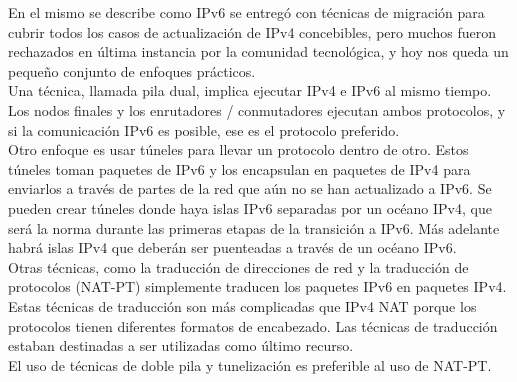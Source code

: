 \documentclass[osajnl,twocolumn,showpacs,superscriptaddress,10pt]{revtex4-1} %
\begin{document}
\begin{enumerate}[a)]
    En el mismo se describe como IPv6 se entregó con técnicas de migración para cubrir todos los casos de actualización de IPv4 
    concebibles, pero muchos fueron rechazados en última instancia por la comunidad tecnológica, y hoy nos queda un pequeño 
    conjunto de enfoques prácticos. \\

    Una técnica, llamada pila dual, implica ejecutar IPv4 e IPv6 al mismo tiempo. Los nodos finales y los enrutadores / conmutadores 
    ejecutan ambos protocolos, y si la comunicación IPv6 es posible, ese es el protocolo preferido. \\

    Otro enfoque es usar túneles para llevar un protocolo dentro de otro. Estos túneles toman paquetes de 
    IPv6 y los encapsulan en paquetes de IPv4 para enviarlos a través de partes de la red que aún no se han actualizado a IPv6. 
    Se pueden crear túneles donde haya islas IPv6 separadas por un océano IPv4, que será la norma durante las primeras 
    etapas de la transición a IPv6. Más adelante habrá islas IPv4 que deberán ser puenteadas a través de un océano IPv6. \\

    Otras técnicas, como la traducción de direcciones de red y la traducción de protocolos (NAT-PT) simplemente traducen los 
    paquetes IPv6 en paquetes IPv4. Estas técnicas de traducción son más complicadas que IPv4 NAT porque los protocolos tienen 
    diferentes formatos de encabezado. Las técnicas de traducción estaban destinadas a ser utilizadas como último recurso. \\

    El uso de técnicas de doble pila y tunelización es preferible al uso de NAT-PT.

\end{enumerate}
\end{document}
